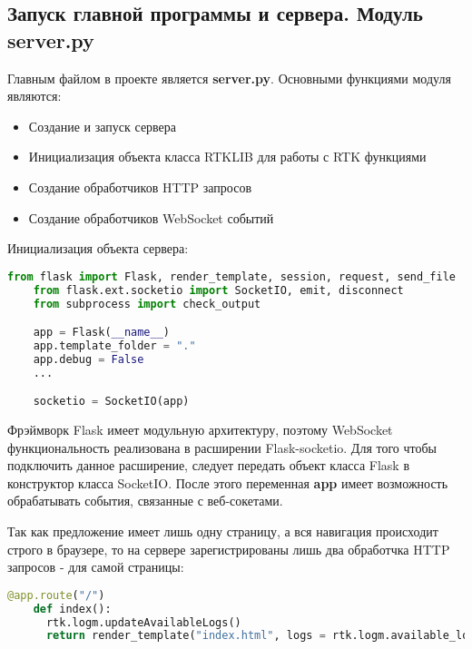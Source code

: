 \subsection{Запуск главной программы и сервера. Модуль server.py} \label{subsect3_1_5}

Главным файлом в проекте является \textbf{server.py}. Основными функциями модуля являются:

\begin{itemize}
  \item Создание и запуск сервера
  \item Инициализация объекта класса RTKLIB для работы с RTK функциями
  \item Создание обработчиков HTTP запросов
  \item Создание обработчиков WebSocket событий
\end{itemize}

Инициализация объекта сервера:

\begin{ListingEnv}[H]
  \caption{Инициализация сервера}
  \label{list:hwbeauty}
  \begin{lstlisting}[language=Python]
    from flask import Flask, render_template, session, request, send_file
    from flask.ext.socketio import SocketIO, emit, disconnect
    from subprocess import check_output

    app = Flask(__name__)
    app.template_folder = "."
    app.debug = False
    ...

    socketio = SocketIO(app)
  \end{lstlisting}
\end{ListingEnv}


Фрэймворк Flask имеет модульную архитектуру, поэтому WebSocket функциональность реализована в расширении Flask-socketio. Для того чтобы подключить данное расширение, следует передать объект класса Flask в конструктор класса SocketIO. После этого переменная \textbf{app} имеет возможность обрабатывать события, связанные с веб-сокетами.

Так как предложение имеет лишь одну страницу, а вся навигация происходит строго в браузере, то на сервере зарегистрированы лишь два обработчка HTTP запросов - для самой страницы:

\begin{ListingEnv}[H]
  \caption{Обработчик HTTP запроса в Flask приложении}
  \label{list:hwbeauty}
  \begin{lstlisting}[language=Python]
    @app.route("/")
    def index():
      rtk.logm.updateAvailableLogs()
      return render_template("index.html", logs = rtk.logm.available_logs, system_status = reach_tools.getSystemStatus())
  \end{lstlisting}
\end{ListingEnv}


